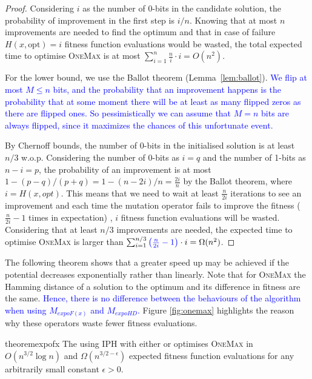 \documentclass[lettersize,journal]{IEEEtran}
\newcommand{\new}[1]{\textcolor{blue}{#1}}
\begin{document}
\begin{proof}
Considering $i$ as the number of 0-bits in the candidate solution, the probability of improvement in the first step is $i/n$. Knowing that at most $n$ improvements are needed to find the optimum and that in case of failure $H(x,\text{opt})=i$ fitness function evaluations would be wasted, the total expected time to optimise \textsc{OneMax} is at most $\sum_{i=1}^n \frac{n}{i} \cdot i =O(n^2)$.

For the lower bound, we use the Ballot theorem (Lemma~\ref{lem:ballot}). 
\new{We flip at most $M \le n$ bits, and the probability that an improvement happens is the probability that at some moment there will be at least as many flipped zeros as there are flipped ones. So pessimistically we can assume that  $M = n$ bits are always flipped, since it maximizes the chances of this unfortunate event.} 

By Chernoff bounds, the number of 0-bits in the initialised solution is at least $n/3$ w.o.p. Considering the number of 
0-bits as $i=q$ and the number of 1-bits as $n-i=p$, the probability of 
an improvement is at most $1-(p-q)/(p+q)=1-(n-2i)/n=\frac{2i}{n}$ by the Ballot theorem, where $i=H(x, opt)$. This means that we need to wait at least $\frac{n}{2i}$ iterations to see an improvement and each time the mutation operator fails to improve the fitness {(\color{blue}$\frac{n}{2i} - 1$ times in expectation) }, $i$ fitness function evaluations will be wasted. Considering that at least $n/3$ improvements are needed, the expected time to optimise \textsc{OneMax} is larger than $\sum_{i=1}^{n/3} {\color{blue}\left(\frac{n}{2i}-1\right)} \cdot i= \Omega(n^2)$.
\end{proof}

The following theorem shows that a greater speed up may be achieved if the potential decreases exponentially rather than linearly. Note that for \textsc{OneMax} the Hamming distance of a solution to the optimum and its difference in fitness are the same. %
\new{Hence, there is no difference between the behaviours of the algorithm when using $M_{expoF(x)}$ and $M_{expoHD}$.} 
Figure \ref{fig:onemax} highlights the reason why these operators waste fewer fitness evaluations.

\begin{restatable}{theorem}{expofx} \label{cor:omexpohd}
The {\oneoneIA } using IPH with either {\expoF } or {\expoHD } optimises \textsc{OneMax} in $O(n^{3/2} \log 
n)$ and $\Omega(n^{3/2-\epsilon})$ expected fitness function evaluations for 
any arbitrarily small constant $\epsilon>0$.
\end{restatable}
\end{document}
